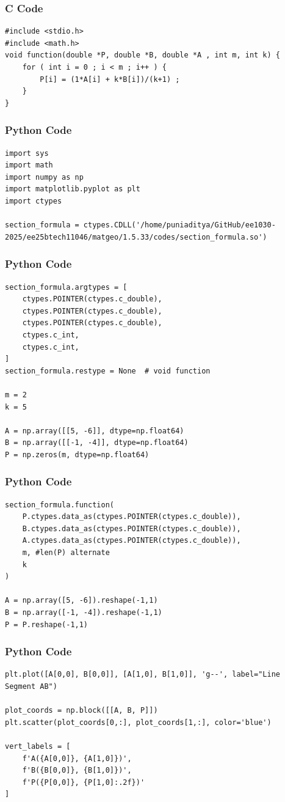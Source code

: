 \documentclass{beamer}
\begin{document}
\begin{frame}[fragile]
    \frametitle{C Code}
    \begin{lstlisting}
#include <stdio.h>
#include <math.h>
void function(double *P, double *B, double *A , int m, int k) {
    for ( int i = 0 ; i < m ; i++ ) {
        P[i] = (1*A[i] + k*B[i])/(k+1) ; 
    }
}
    \end{lstlisting}
\end{frame}

\begin{frame}[fragile]
    \frametitle{Python Code}
    \begin{lstlisting}
import sys
import math
import numpy as np
import matplotlib.pyplot as plt
import ctypes

section_formula = ctypes.CDLL('/home/puniaditya/GitHub/ee1030-2025/ee25btech11046/matgeo/1.5.33/codes/section_formula.so')
    \end{lstlisting}
\end{frame}

\begin{frame}[fragile]
    \frametitle{Python Code}
    \begin{lstlisting}
section_formula.argtypes = [
    ctypes.POINTER(ctypes.c_double),
    ctypes.POINTER(ctypes.c_double),
    ctypes.POINTER(ctypes.c_double),
    ctypes.c_int,
    ctypes.c_int,
]
section_formula.restype = None  # void function

m = 2
k = 5

A = np.array([[5, -6]], dtype=np.float64)
B = np.array([[-1, -4]], dtype=np.float64)
P = np.zeros(m, dtype=np.float64)
    \end{lstlisting}
\end{frame}

\begin{frame}[fragile]
    \frametitle{Python Code}
    \begin{lstlisting}
section_formula.function(
    P.ctypes.data_as(ctypes.POINTER(ctypes.c_double)),
    B.ctypes.data_as(ctypes.POINTER(ctypes.c_double)),
    A.ctypes.data_as(ctypes.POINTER(ctypes.c_double)),
    m, #len(P) alternate
    k
)

A = np.array([5, -6]).reshape(-1,1)
B = np.array([-1, -4]).reshape(-1,1)
P = P.reshape(-1,1)
    \end{lstlisting}
\end{frame}

\begin{frame}[fragile]
    \frametitle{Python Code}
    \begin{lstlisting}
plt.plot([A[0,0], B[0,0]], [A[1,0], B[1,0]], 'g--', label="Line Segment AB")

plot_coords = np.block([[A, B, P]])
plt.scatter(plot_coords[0,:], plot_coords[1,:], color='blue')

vert_labels = [
    f'A({A[0,0]}, {A[1,0]})',
    f'B({B[0,0]}, {B[1,0]})',
    f'P({P[0,0]}, {P[1,0]:.2f})'
]
    \end{lstlisting}
\end{frame}
\end{document}
